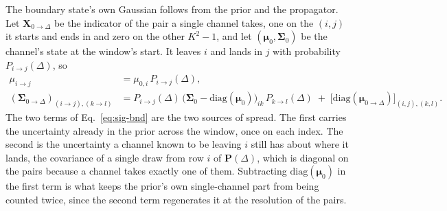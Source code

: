 \begin{appendixbox}
The boundary state's own Gaussian follows from the prior and the propagator. Let
$\mathbf{X}_{0\to\Delta}$ be the indicator of the pair a single channel takes, one on the
$(i,j)$ it starts and ends in and zero on the other $K^2-1$, and let
$(\boldsymbol{\mu}_0,\boldsymbol{\Sigma}_0)$ be the channel's state at the window's start. It leaves $i$ and
lands in $j$ with probability $P_{i\to j}(\Delta)$, so
\begin{align}
  \mu_{i\to j} &= \mu_{0,i}\,P_{i\to j}(\Delta), \label{eq:mu-bnd}\\
  (\boldsymbol{\Sigma}_{0\to\Delta})_{(i\to j),(k\to l)} &=
    P_{i\to j}(\Delta)\,\bigl(\boldsymbol{\Sigma}_0-\mathrm{diag}(\boldsymbol{\mu}_0)\bigr)_{i k}\,
    P_{k\to l}(\Delta)
    \;+\; \bigl[\mathrm{diag}(\boldsymbol{\mu}_{0\to\Delta})\bigr]_{(i,j),(k,l)}.
  \label{eq:sig-bnd}
\end{align}
The two terms of Eq.~\ref{eq:sig-bnd} are the two sources of spread. The first carries the
uncertainty already in the prior across the window, once on each index. The second is the
uncertainty a channel known to be leaving $i$ still has about where it lands, the covariance
of a single draw from row $i$ of $\mathbf{P}(\Delta)$, which is diagonal on the pairs
because a channel takes exactly one of them. Subtracting $\mathrm{diag}(\boldsymbol{\mu}_0)$ in the
first term is what keeps the prior's own single-channel part from being counted twice, since
the second term regenerates it at the resolution of the pairs.


\end{appendixbox}
